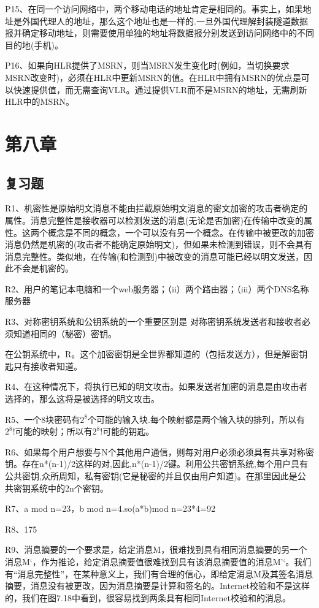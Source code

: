 \documentclass[11pt,UTF8,twoside]{article}
\begin{document}
{		P15、在同一个访问网络中，两个移动电话的地址肯定是相同的。事实上，如果地址是外国代理人的地址，那么这个地址也是一样的.一旦外国代理解封装隧道数据报并确定移动地址，则需要使用单独的地址将数据报分别发送到访问网络中的不同目的地(手机)。
		
		P16、如果向HLR提供了MSRN，则当MSRN发生变化时(例如，当切换要求MSRN改变时)，必须在HLR中更新MSRN的值。在HLR中拥有MSRN的优点是可以快速提供值，而无需查询VLR。通过提供VLR而不是MSRN的地址，无需刷新HLR中的MSRN。
		
			\newpage
		\pagestyle{fancy}
		\fancyhf{}  %
		\pagestyle{fancy}		
		\section{第八章}
		\subsection{复习题}
		R1、机密性是原始明文消息不能由拦截原始明文消息的密文加密的攻击者确定的属性。消息完整性是接收器可以检测发送的消息(无论是否加密)在传输中改变的属性。这两个概念是不同的概念，一个可以没有另一个概念。在传输中被更改的加密消息仍然是机密的(攻击者不能确定原始明文)，但如果未检测到错误，则不会具有消息完整性。类似地，在传输(和检测到)中被改变的消息可能已经以明文发送，因此不会是机密的。
		
		R2、用户的笔记本电脑和一个web服务器；（ii）两个路由器；（iii）两个DNS名称服务器
		
		R3、对称密钥系统和公钥系统的一个重要区别是
对称密钥系统发送者和接收者必须知道相同的（秘密）密钥。

		在公钥系统中，R。这个加密密钥是全世界都知道的（包括发送方），但是解密钥匙只有接收者知道。
		
		R4、在这种情况下，将执行已知的明文攻击。如果发送者加密的消息是由攻击者选择的，那么这将是被选择的明文攻击。
		
		R5、一个8块密码有$2^8$个可能的输入块.每个映射都是两个输入块的排列，所以有$2^8!$可能的映射；所以有$2^8!$可能的钥匙。
		
		R6、如果每个用户想要与N个其他用户通信，则每对用户必须必须具有共享对称密钥。存在n*(n-1)/2这样的对,因此,n*(n-1)/2键。利用公共密钥系统,每个用户具有公共密钥,众所周知，私有密钥(它是秘密的并且仅由用户知道)。在那里因此是公共密钥系统中的2n个密钥。
		
		R7、a mod n=23，b mod n=4.so(a*b)mod n=23*4=92
		
		R8、175
		
		R9、消息摘要的一个要求是，给定消息M，很难找到具有相同消息摘要的另一个消息M‘，作为推论，给定消息摘要值很难找到具有该消息摘要值的消息M’‘。我们有“消息完整性”，在某种意义上，我们有合理的信心，即给定消息M及其签名消息摘要，消息没有被更改，因为消息摘要是计算和签名的。Internet校验和不是这样的，我们在图7.18中看到，很容易找到两条具有相同Internet校验和的消息。
		
}
\end{document}
